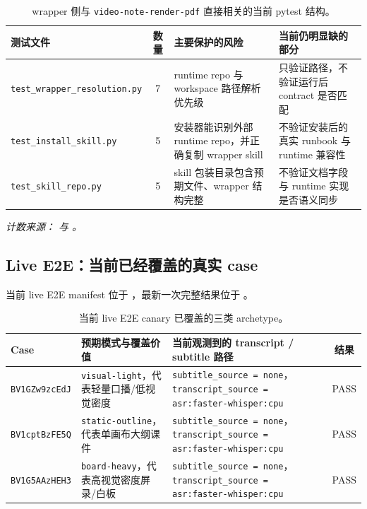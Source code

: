 \documentclass[a4paper]{article}
\begin{document}
\begin{table}[H]
\centering
\small
\begin{tabularx}{\textwidth}{>{\raggedright\arraybackslash}p{2.8cm}cYY}
\toprule
测试文件 & 数量 & 主要保护的风险 & 当前仍明显缺的部分 \\
\midrule
\texttt{test\_wrapper\_resolution.py} & 7 & runtime repo 与 workspace 路径解析优先级 & 只验证路径，不验证运行后 contract 是否匹配 \\
\texttt{test\_install\_skill.py} & 5 & 安装器能识别外部 runtime repo，并正确复制 wrapper skill & 不验证安装后的真实 runbook 与 runtime 兼容性 \\
\texttt{test\_skill\_repo.py} & 5 & skill 包装目录包含预期文件、wrapper 结构完整 & 不验证文档字段与 runtime 实现是否语义同步 \\
\bottomrule
\end{tabularx}
\caption{wrapper 侧与 \texttt{video-note-render-pdf} 直接相关的当前 pytest 结构。}
\end{table}

\noindent\small\emph{计数来源： 与 。}\normalsize

\subsection{Live E2E：当前已经覆盖的真实 case}

当前 live E2E manifest 位于 ，最新一次完整结果位于 。

\begin{table}[H]
\centering
\small
\begin{tabularx}{\textwidth}{>{\raggedright\arraybackslash}p{2.4cm}YYc}
\toprule
Case & 预期模式与覆盖价值 & 当前观测到的 transcript / subtitle 路径 & 结果 \\
\midrule
\texttt{BV1GZw9zcEdJ} & \texttt{visual-light}，代表轻量口播/低视觉密度 & \texttt{subtitle\_source = none}，\texttt{transcript\_source = asr:faster-whisper:cpu} & PASS \\
\texttt{BV1cptBzFE5Q} & \texttt{static-outline}，代表单画布大纲课件 & \texttt{subtitle\_source = none}，\texttt{transcript\_source = asr:faster-whisper:cpu} & PASS \\
\texttt{BV1G5AAzHEH3} & \texttt{board-heavy}，代表高视觉密度屏录/白板 & \texttt{subtitle\_source = none}，\texttt{transcript\_source = asr:faster-whisper:cpu} & PASS \\
\bottomrule
\end{tabularx}
\caption{当前 live E2E canary 已覆盖的三类 archetype。}
\end{table}
\end{document}
